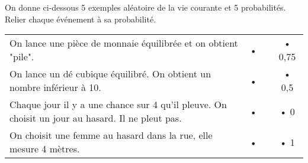 
On donne ci-dessous 5 exemples aléatoire de la vie courante et 5 probabilités. Relier chaque événement à sa probabilité.

\vspace{1cm}


\begin{tabular}{p{13.5cm}cp{2cm}c}
 
On lance une pièce de monnaie équilibrée et on obtient "pile". & • &    &• 0,75 \\ 

On lance un dé cubique équilibré. On obtient un nombre inférieur à 10. & •  &  & • 0,5 \\ 

 
Chaque jour il y a une chance sur 4 qu'il pleuve. On choisit un jour au hasard. Il ne pleut pas. & • &  & • 0 \\ 

On choisit une femme au hasard dans la rue, elle mesure 4 mètres. & • &  &  • 1 \\ 
 
\end{tabular} 
